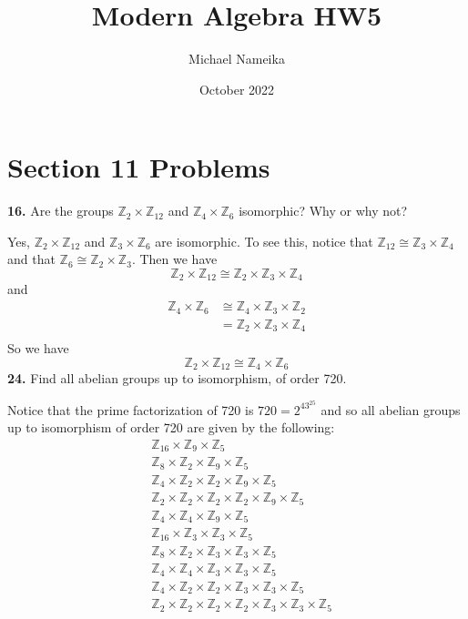 \documentclass{article}
\title{Modern Algebra HW5}
\author{Michael Nameika}
\date{October 2022}
\begin{document}
\maketitle

\section*{Section 11 Problems}
\textbf{16.} Are the groups $\mathbb{Z}_2 \times \mathbb{Z}_{12}$ and $\mathbb{Z}_4 \times \mathbb{Z}_6$ isomorphic? Why or why not?
\newline

Yes, $\mathbb{Z}_2 \times \mathbb{Z}_{12}$ and $\mathbb{Z}_3 \times \mathbb{Z}_6$ are isomorphic. To see this, notice that $\mathbb{Z}_{12} \cong \mathbb{Z}_{3} \times \mathbb{Z}_4$ and that $\mathbb{Z}_6 \cong \mathbb{Z}_2 \times \mathbb{Z}_3$. Then we have
\[\mathbb{Z}_2 \times \mathbb{Z}_{12} \cong \mathbb{Z}_2 \times \mathbb{Z}_3 \times \mathbb{Z}_4\]
and
\begin{align*}
    \mathbb{Z}_4 \times \mathbb{Z}_6 &\cong \mathbb{Z}_4 \times \mathbb{Z}_3 \times \mathbb{Z}_2 \\
    &= \mathbb{Z}_2 \times \mathbb{Z}_3 \times \mathbb{Z}_4 \\
\end{align*}
So we have
\[\mathbb{Z}_2 \times \mathbb{Z}_{12} \cong \mathbb{Z}_4 \times \mathbb{Z}_6\]
\textbf{24.} Find all abelian groups up to isomorphism, of order 720. 
\newline

Notice that the prime factorization of 720 is $720 = 2^43^25$ and so all abelian groups up to isomorphism of order 720 are given by the following:
\begin{align*}
    &\mathbb{Z}_{16} \times \mathbb{Z}_9 \times \mathbb{Z}_5 \\
    &\mathbb{Z}_{8} \times \mathbb{Z}_2 \times \mathbb{Z}_9 \times \mathbb{Z}_5 \\
    &\mathbb{Z}_4 \times \mathbb{Z}_2 \times \mathbb{Z}_2 \times \mathbb{Z}_9 \times \mathbb{Z}_5 \\
    &\mathbb{Z}_2 \times \mathbb{Z}_2 \times \mathbb{Z}_2 \times \mathbb{Z}_2 \times \mathbb{Z}_9 \times \mathbb{Z}_5 \\
    &\mathbb{Z}_4 \times \mathbb{Z}_4 \times \mathbb{Z}_9 \times \mathbb{Z}_5 \\
    &\mathbb{Z}_{16} \times \mathbb{Z}_3 \times \mathbb{Z}_3 \times \mathbb{Z}_5 \\
    &\mathbb{Z}_8 \times \mathbb{Z}_2 \times \mathbb{Z}_3 \times \mathbb{Z}_3 \times \mathbb{Z}_5 \\
    &\mathbb{Z}_4 \times \mathbb{Z}_4 \times \mathbb{Z}_3 \times \mathbb{Z}_3 \times \mathbb{Z}_5 \\
    &\mathbb{Z}_4 \times \mathbb{Z}_2 \times \mathbb{Z}_2 \times \mathbb{Z}_3 \times \mathbb{Z}_3 \times \mathbb{Z}_5 \\
    &\mathbb{Z}_2 \times \mathbb{Z}_2 \times \mathbb{Z}_2 \times \mathbb{Z}_2 \times \mathbb{Z}_3 \times \mathbb{Z}_3 \times \mathbb{Z}_5 \\
\end{align*}
\end{document}

